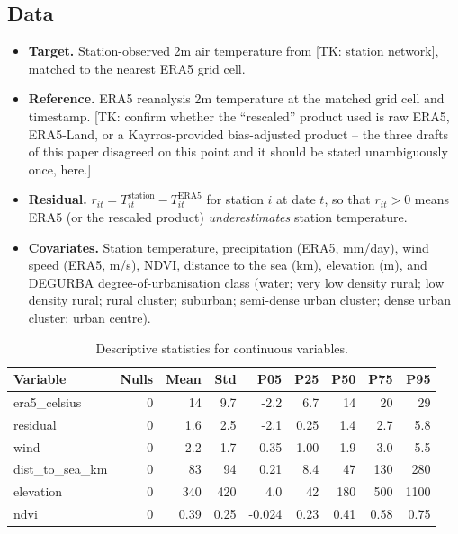 \documentclass[a4paper,12pt,leqno]{article}
\begin{document}
\subsection{Data}

\begin{itemize}
\item \textbf{Target.} Station-observed 2m air temperature from
[TK: station network], matched to the nearest ERA5 grid cell.
\item \textbf{Reference.} ERA5 reanalysis 2m temperature
\parencite{TODO:era5_hersbach2020} at the matched grid cell and
timestamp. [TK: confirm whether the ``rescaled'' product used is raw
ERA5, ERA5-Land, or a Kayrros-provided bias-adjusted product -- the
three drafts of this paper disagreed on this point and it should be
stated unambiguously once, here.]
\item \textbf{Residual.} $r_{it} = T^{\text{station}}_{it} -
T^{\text{ERA5}}_{it}$ for station $i$ at date $t$, so that $r_{it}>0$
means ERA5 (or the rescaled product) \emph{underestimates} station
temperature.
\item \textbf{Covariates.} Station temperature, precipitation (ERA5,
mm/day), wind speed (ERA5, m/s), NDVI, distance to the sea (km),
elevation (m), and DEGURBA degree-of-urbanisation class (water; very
low density rural; low density rural; rural cluster; suburban;
semi-dense urban cluster; dense urban cluster; urban centre).
\end{itemize}

\begin{table}[htbp]
\centering
\small
\caption{Descriptive statistics for continuous variables.}
\label{tab:desc_continuous}
\begin{tabular}{lrrrrrrrr}
\toprule
Variable & Nulls & Mean & Std & P05 & P25 & P50 & P75 & P95 \\
\midrule
era5\_celsius & 0 & 14 & 9.7 & -2.2 & 6.7 & 14 & 20 & 29 \\
residual & 0 & 1.6 & 2.5 & -2.1 & 0.25 & 1.4 & 2.7 & 5.8 \\
wind & 0 & 2.2 & 1.7 & 0.35 & 1.00 & 1.9 & 3.0 & 5.5 \\
dist\_to\_sea\_km & 0 & 83 & 94 & 0.21 & 8.4 & 47 & 130 & 280 \\
elevation & 0 & 340 & 420 & 4.0 & 42 & 180 & 500 & 1100 \\
ndvi & 0 & 0.39 & 0.25 & -0.024 & 0.23 & 0.41 & 0.58 & 0.75 \\
\bottomrule
\end{tabular}
\end{table}
\end{document}

